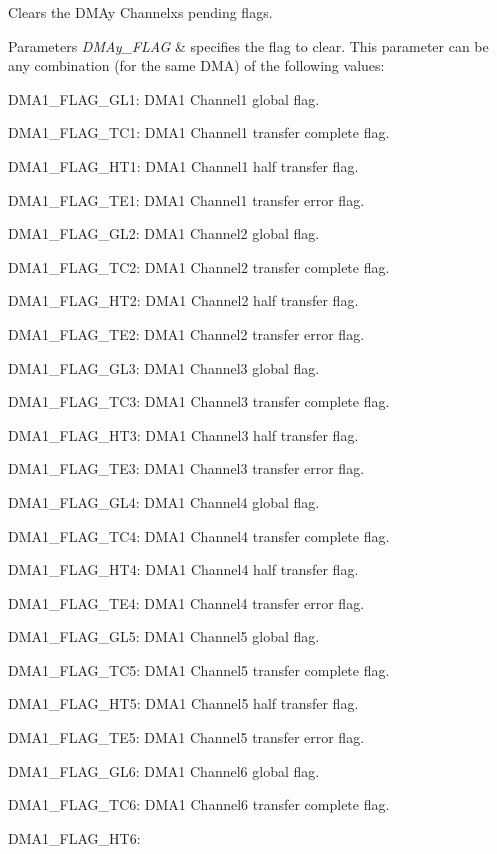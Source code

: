 Clears the D\+M\+Ay Channelx\textquotesingle{}s pending flags. 


\begin{DoxyParams}{Parameters}
{\em D\+M\+Ay\+\_\+\+F\+L\+AG} & specifies the flag to clear. This parameter can be any combination (for the same D\+MA) of the following values\+: \begin{DoxyItemize}
\item D\+M\+A1\+\_\+\+F\+L\+A\+G\+\_\+\+G\+L1\+: D\+M\+A1 Channel1 global flag. \item D\+M\+A1\+\_\+\+F\+L\+A\+G\+\_\+\+T\+C1\+: D\+M\+A1 Channel1 transfer complete flag. \item D\+M\+A1\+\_\+\+F\+L\+A\+G\+\_\+\+H\+T1\+: D\+M\+A1 Channel1 half transfer flag. \item D\+M\+A1\+\_\+\+F\+L\+A\+G\+\_\+\+T\+E1\+: D\+M\+A1 Channel1 transfer error flag. \item D\+M\+A1\+\_\+\+F\+L\+A\+G\+\_\+\+G\+L2\+: D\+M\+A1 Channel2 global flag. \item D\+M\+A1\+\_\+\+F\+L\+A\+G\+\_\+\+T\+C2\+: D\+M\+A1 Channel2 transfer complete flag. \item D\+M\+A1\+\_\+\+F\+L\+A\+G\+\_\+\+H\+T2\+: D\+M\+A1 Channel2 half transfer flag. \item D\+M\+A1\+\_\+\+F\+L\+A\+G\+\_\+\+T\+E2\+: D\+M\+A1 Channel2 transfer error flag. \item D\+M\+A1\+\_\+\+F\+L\+A\+G\+\_\+\+G\+L3\+: D\+M\+A1 Channel3 global flag. \item D\+M\+A1\+\_\+\+F\+L\+A\+G\+\_\+\+T\+C3\+: D\+M\+A1 Channel3 transfer complete flag. \item D\+M\+A1\+\_\+\+F\+L\+A\+G\+\_\+\+H\+T3\+: D\+M\+A1 Channel3 half transfer flag. \item D\+M\+A1\+\_\+\+F\+L\+A\+G\+\_\+\+T\+E3\+: D\+M\+A1 Channel3 transfer error flag. \item D\+M\+A1\+\_\+\+F\+L\+A\+G\+\_\+\+G\+L4\+: D\+M\+A1 Channel4 global flag. \item D\+M\+A1\+\_\+\+F\+L\+A\+G\+\_\+\+T\+C4\+: D\+M\+A1 Channel4 transfer complete flag. \item D\+M\+A1\+\_\+\+F\+L\+A\+G\+\_\+\+H\+T4\+: D\+M\+A1 Channel4 half transfer flag. \item D\+M\+A1\+\_\+\+F\+L\+A\+G\+\_\+\+T\+E4\+: D\+M\+A1 Channel4 transfer error flag. \item D\+M\+A1\+\_\+\+F\+L\+A\+G\+\_\+\+G\+L5\+: D\+M\+A1 Channel5 global flag. \item D\+M\+A1\+\_\+\+F\+L\+A\+G\+\_\+\+T\+C5\+: D\+M\+A1 Channel5 transfer complete flag. \item D\+M\+A1\+\_\+\+F\+L\+A\+G\+\_\+\+H\+T5\+: D\+M\+A1 Channel5 half transfer flag. \item D\+M\+A1\+\_\+\+F\+L\+A\+G\+\_\+\+T\+E5\+: D\+M\+A1 Channel5 transfer error flag. \item D\+M\+A1\+\_\+\+F\+L\+A\+G\+\_\+\+G\+L6\+: D\+M\+A1 Channel6 global flag. \item D\+M\+A1\+\_\+\+F\+L\+A\+G\+\_\+\+T\+C6\+: D\+M\+A1 Channel6 transfer complete flag. \item D\+M\+A1\+\_\+\+F\+L\+A\+G\+\_\+\+H\+T6\+: 
\end{DoxyItemize}
\end{DoxyParams}

